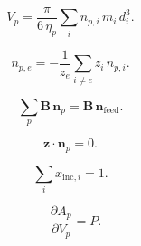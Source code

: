 \documentclass[11pt]{article}
\begin{document}
\begin{equation}
V_p=\frac{\pi}{6\,\eta_p}\sum_i n_{p,i}\,m_i\,d_i^{3}.
\label{eq:phase_packing_volume}
\end{equation}

\begin{equation}
n_{p,e}=-\frac{1}{z_e}\sum_{i\neq e} z_i\,n_{p,i}.
\label{eq:electroneutral_amount_chart}
\end{equation}

\begin{equation}
\sum_p \mathbf{B}\,\boldsymbol n_p=\mathbf{B}\,\boldsymbol n_{\mathrm{feed}}.
\label{eq:material_balance}
\end{equation}

\begin{equation}
\boldsymbol z\cdot\boldsymbol n_p=0.
\label{eq:phase_electroneutrality}
\end{equation}

\begin{equation}
\sum_i x_{\mathrm{inc},i}=1.
\label{eq:incipient_normalization}
\end{equation}

\begin{equation}
-\frac{\partial A_p}{\partial V_p}=P.
\label{eq:pressure_equality}
\end{equation}
\end{document}

